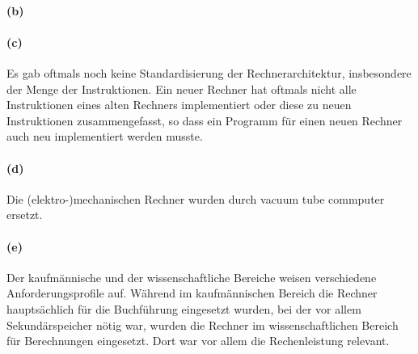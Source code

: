 \documentclass[a4paper]{article}
\begin{document}
\paragraph{(b)}

\paragraph{(c)}
Es gab oftmals noch keine Standardisierung der Rechnerarchitektur, insbesondere der Menge der Instruktionen. Ein neuer Rechner hat oftmals nicht alle Instruktionen eines alten Rechners implementiert oder diese zu neuen Instruktionen zusammengefasst, so dass ein Programm für einen neuen Rechner auch neu implementiert werden musste.


\paragraph{(d)}
Die (elektro-)mechanischen Rechner wurden durch vacuum tube commputer ersetzt.

\paragraph{(e)}
Der kaufmännische und der wissenschaftliche Bereiche weisen verschiedene Anforderungsprofile auf. Während im kaufmännischen Bereich die Rechner hauptsächlich für die Buchführung eingesetzt wurden, bei der vor allem Sekundärspeicher nötig war, wurden die Rechner im wissenschaftlichen Bereich für Berechnungen eingesetzt. Dort war vor allem die Rechenleistung relevant.
\end{document}
